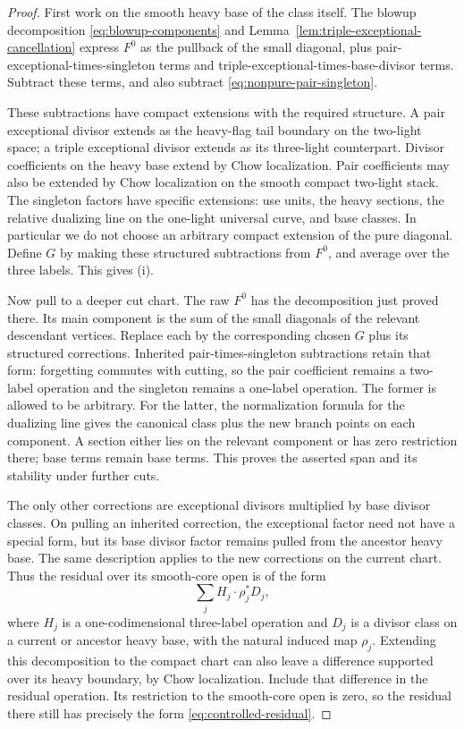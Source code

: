 \begin{proof}
First work on the smooth heavy base of the class itself.  The blowup
decomposition \eqref{eq:blowup-components} and
Lemma~\ref{lem:triple-exceptional-cancellation} express $F^0$ as the
pullback of the small diagonal, plus pair-exceptional-times-singleton
terms and triple-exceptional-times-base-divisor terms.  Subtract these
terms, and also subtract \eqref{eq:nonpure-pair-singleton}.

These subtractions have compact extensions with the required
structure.  A pair exceptional divisor extends as the heavy-flag
tail boundary on the two-light space; a triple exceptional divisor
extends as its three-light counterpart.  Divisor coefficients on
the heavy base extend by Chow localization.  Pair coefficients may
also be extended by Chow localization on the smooth compact
two-light stack.  The singleton factors have specific extensions:
use units, the heavy sections, the relative dualizing line on the
one-light universal curve, and base classes.  In particular we do
not choose an arbitrary compact extension of the pure diagonal.
Define $G$ by making these structured subtractions from $F^0$, and
average over the three labels.  This gives \textup{(i)}.

Now pull to a deeper cut chart.  The raw $F^0$ has the decomposition
just proved there.  Its main component is the sum of the small
diagonals of the relevant descendant vertices.  Replace each by the
corresponding chosen $G$ plus its structured corrections.
Inherited pair-times-singleton subtractions retain that form:
forgetting commutes with cutting, so the pair coefficient remains a
two-label operation and the singleton remains a one-label operation.
The former is allowed to be arbitrary.  For the latter, the
normalization formula for the dualizing line gives the canonical
class plus the new branch points on each component.  A section
either lies on the relevant component or has zero restriction there;
base terms remain base terms.  This proves the asserted span and its
stability under further cuts.

The only other corrections are exceptional divisors multiplied by
base divisor classes.  On pulling an inherited correction, the
exceptional factor need not have a special form, but its base
divisor factor remains pulled from the ancestor heavy base.
The same description applies to the new corrections on the current
chart.  Thus the residual over its smooth-core open is of the form
\begin{equation}\label{eq:controlled-residual}
 \sum_j H_j\cdot\rho_j^*D_j,
\end{equation}
where $H_j$ is a one-codimensional three-label operation and $D_j$
is a divisor class on a current or ancestor heavy base, with the
natural induced map $\rho_j$.
Extending this decomposition to the compact chart can also leave a
difference supported over its heavy boundary, by Chow localization.
Include that difference in the residual operation.  Its restriction to
the smooth-core open is zero, so the residual there still has precisely
the form \eqref{eq:controlled-residual}.


\end{proof}
